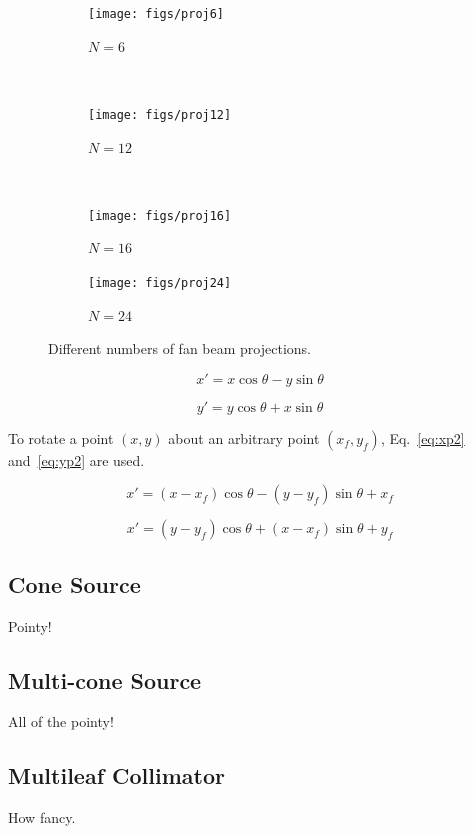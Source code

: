 \begin{figure}
    \centering
    \begin{subfigure}[b]{0.2\textwidth}
        \texttt{[image: figs/proj6]}
        \caption{$N=6$}
        \label{fig:proj6}
    \end{subfigure}
    ~ %
    \begin{subfigure}[b]{0.2\textwidth}
        \texttt{[image: figs/proj12]}
        \caption{$N=12$}
        \label{fig:proj12}
    \end{subfigure}
    ~ %
    \begin{subfigure}[b]{0.2\textwidth}
        \texttt{[image: figs/proj16]}
        \caption{$N=16$}
        \label{fig:proj16}
    \end{subfigure}
    \begin{subfigure}[b]{0.2\textwidth}
        \texttt{[image: figs/proj24]}
        \caption{$N=24$}
        \label{fig:proj24}
    \end{subfigure}
    \caption{Different numbers of fan beam projections.}\label{fig:fanproj}
\end{figure}

\begin{equation}\label{eq:xp}
x' = x \cos \theta - y \sin \theta
\end{equation}

\begin{equation}\label{eq:yp}
y' = y \cos \theta + x \sin \theta
\end{equation}

To rotate a point $(x,y)$ about an arbitrary point $(x_f, y_f)$, Eq.~\ref{eq:xp2} and~\ref{eq:yp2} are used.

\begin{equation}\label{eq:xp2}
x' = (x-x_f) \cos \theta - (y-y_f) \sin \theta + x_f
\end{equation}

\begin{equation}\label{eq:yp2}
x' = (y - y_f) \cos \theta + (x - x_f) \sin \theta + y_f
\end{equation}

\subsection{Cone Source}
Pointy!

\subsection{Multi-cone Source}
All of the pointy!

\subsection{Multileaf Collimator}
How fancy.

\endinput
